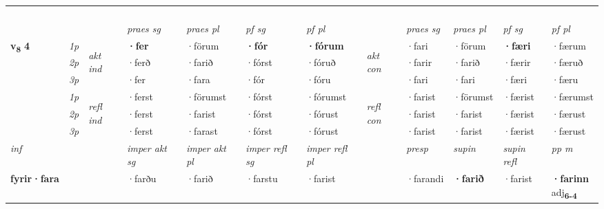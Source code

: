 \begin{longtable}[l]{X>{\footnotesize\itshape}llXXXXlXXXX}
\midrule
  & \\*
    & \\*
   & \\*
  & \\
   \midrule
 & &   & \textit{praes sg}  & \textit{praes pl}    & \textit{ pf sg} & \textit{pf pl} & & \textit{praes sg}  & \textit{praes pl}    & \textit{pf sg} & \textit{pf pl }  \\ \cmidrule{4-7} \cmidrule{9-12}
 \multirow{2}{*}{{{\textbf{v{\textsubscript{8}}} \Large{\textbf{4}}}}}  & 1p & \multirow{3}{*}{\begin{turn}{90}\textit{akt ind}\end{turn}} & \textbf{·fer} & ·förum & \textbf{·fór} & \textbf{·fórum} & \multirow{3}{*}{\begin{turn}{90}\textit{akt con}\end{turn}} &·fari & ·förum & \textbf{·færi} & ·færum\\*
 & 2p &  &  ·ferð  & ·farið & ·fórst & ·fóruð & & ·farir & ·farið & ·færir & ·færuð \\*
 & 3p &  & ·fer & ·fara & ·fór & ·fóru & & ·fari & ·fari& ·færi & ·færu \\*
\cmidrule{4-7} \cmidrule{9-12}
 & 1p & \multirow{3}{*}{\begin{turn}{90}\textit{refl ind}\end{turn}}  & ·ferst & ·förumst & ·fórst & ·fórumst & \multirow{3}{*}{\begin{turn}{90}\textit{refl con}\end{turn}}  &·farist & ·förumst & ·færist & ·færumst \\*
 & 2p &  & ·ferst & ·farist & ·fórst & ·fórust & &·farist & ·farist & ·færist & ·færust \\*
 & 3p  & & ·ferst & ·farast & ·fórst & ·fórust & & ·farist & ·farist& ·færist & ·færust \\*
\cmidrule{4-7} \cmidrule{9-12}

   {\textit{inf}} & &  & \textit{imper akt sg} & \textit{imper akt pl} & \textit{imper refl sg} & \textit{imper refl pl} && \textit{presp} & \textit{supin} & \textit{supin refl} & \textit{pp m} \\*
  {\textbf{fyrir\allowbreak ·fara}} & && ·farðu  & ·farið & ·farstu & ·farist && ·farandi &  \textbf{·farið} & ·farist & \specialcell{\textbf{·farinn} \\ adj\textbf{\textsubscript{6-4}}} \\*

\midrule


\end{longtable}
